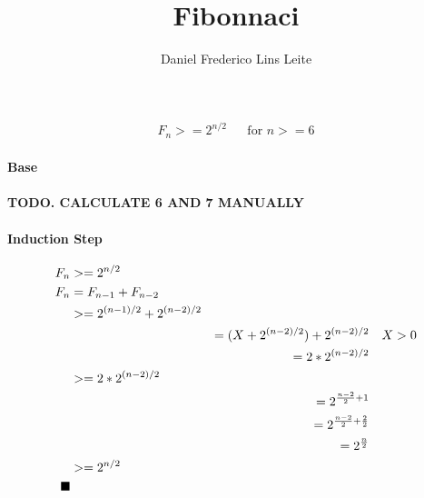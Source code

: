 \documentclass[10pt,a4paper]{article}
\author{Daniel Frederico Lins Leite}
\title{Fibonnaci}
\newcommand{\qed}{\hfill\blacksquare}
\begin{document}
	\maketitle	
\begin{align*}
	F_n >= 2^{n/2} &&\text{for $n >= 6$}
\end{align*}
\paragraph{Base}
\paragraph{TODO. CALCULATE 6 AND 7 MANUALLY}
\paragraph{Induction Step}
\begin{align*}
	F_n &>= 2^{n/2}\\
	F_n &= F_{n-1}+F_{n-2}\\
	&>= 2^{(n-1)/2} + 2^{(n-2)/2}\\
	& &= (X+2^{(n-2)/2}) + 2^{(n-2)/2} &&\text{$X>0$}\\
	& &= 2*2^{(n-2)/2}\\
	&>= 2*2^{(n-2)/2}\\
	& &=2^{\frac{n-2}{2}+1}\\
	& &=2^{\frac{n-2}{2}+\frac{2}{2}}\\
	& &=2^{\frac{n}{2}}\\
	&>= 2^{n/2}\\
	\qed
\end{align*}
\end{document}
